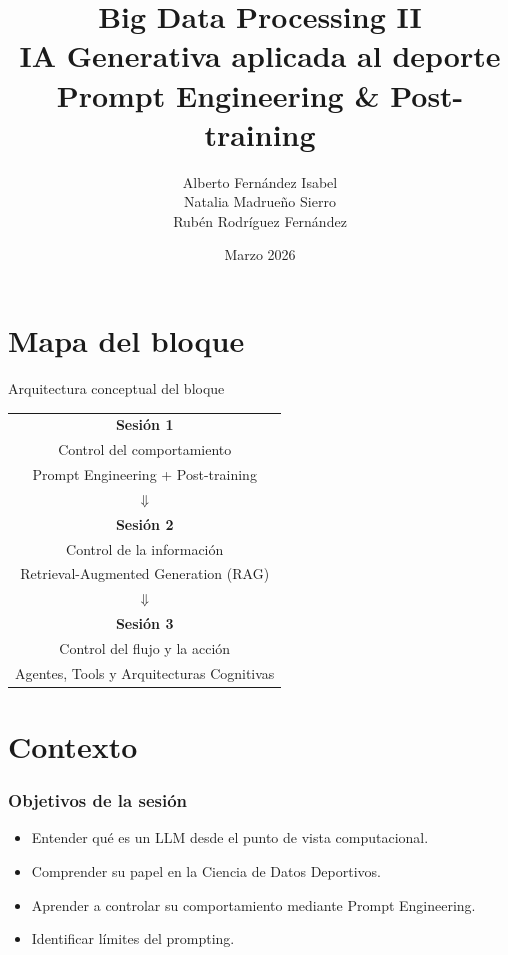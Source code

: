 \documentclass[aspectratio=169]{beamer}
\institute[URJC]{DSLAB}
\author[Big Data Processing II]{
	Alberto Fernández Isabel \\
	Natalia Madrueño Sierro \\
	Rubén Rodríguez Fernández \\
}
\title[Presentación]{
	Big Data Processing II \\ \vspace{0.2em}
	IA Generativa aplicada al deporte \\ \vspace{0.2em}
    Prompt Engineering \& Post-training
}
\date{Marzo 2026}
\begin{document}
\begin{frame}
\titlepage
\end{frame}

\section{Mapa del bloque}
\frame{\sectionpage}

\begin{frame}{Arquitectura conceptual del bloque}
\begin{center}
\Large
\begin{tabular}{c}
{\color{colorblue}\textbf{Sesión 1}} \\ 
{\color{colorblue}Control del comportamiento} \\
{\color{colorblue}\small Prompt Engineering + Post-training}
\\[0.1em]
$\Downarrow$
\\[0.1em]
{\color{gray2}\textbf{Sesión 2}} \\ 
{\color{gray2}Control de la información} \\
{\color{gray2}\small Retrieval-Augmented Generation (RAG)}
\\[0.1em]
$\Downarrow$
\\[0.1em]
{\color{gray2}\textbf{Sesión 3}} \\ 
{\color{gray2}Control del flujo y la acción} \\
{\color{gray2}\small Agentes, Tools y Arquitecturas Cognitivas}
\end{tabular}
\end{center}
\end{frame}

\section{Contexto}
\frame{\sectionpage} 

\begin{frame}\frametitle{Objetivos de la sesión}
\begin{itemize}
    \item Entender qué es un LLM desde el punto de vista computacional.
    \item Comprender su papel en la Ciencia de Datos Deportivos.
    \item Aprender a controlar su comportamiento mediante Prompt Engineering.
    \item Identificar límites del prompting.
\end{itemize}
\end{frame}
\end{document}
